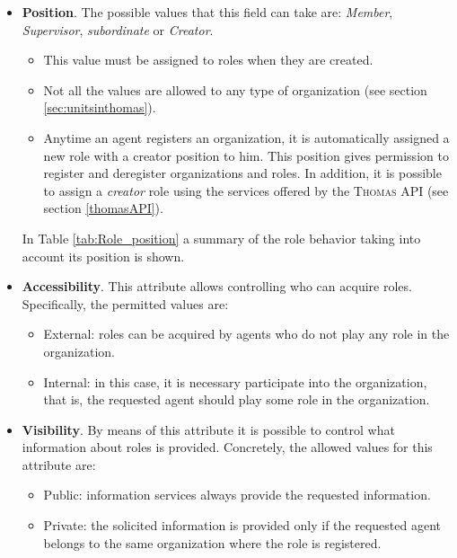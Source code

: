 \begin{itemize}
\item \textbf{Position}. The possible values that this field can take are: \textit{Member}, \textit{Supervisor}, \textit{subordinate} or \textit{Creator}.
\begin{itemize}
\item This value must be assigned to roles when they are created.
\item Not all the values are allowed to any type of organization (see section \ref{sec:unitsinthomas}).
\item Anytime an agent registers an organization, it is automatically assigned a new role with a creator position to him. This position gives permission to register and deregister organizations and roles. In addition, it is possible to assign a \textit{creator} role using the services offered by the \textsc{Thomas} API (see section \ref{thomasAPI}).
\end{itemize}

In Table \ref{tab:Role_position} a summary of the role behavior taking into account its position is shown.


\item \textbf{Accessibility}. This attribute allows controlling who can acquire roles. Specifically, the permitted values are:
\begin{itemize}
	\item External: roles can be acquired by agents who do not play any role in the organization.
	\item Internal: in this case, it is necessary participate into the organization, that is, the requested agent should play some role  in the organization.
\end{itemize}


\item \textbf{Visibility}. By means of this attribute it is possible to control what information about roles is provided. Concretely, the allowed values for this attribute are:
\begin{itemize}
\item Public: information services always provide the requested information.
\item Private: the solicited information is provided only if the requested  agent belongs to the same organization where the role is registered.
\end{itemize}

\end{itemize}

